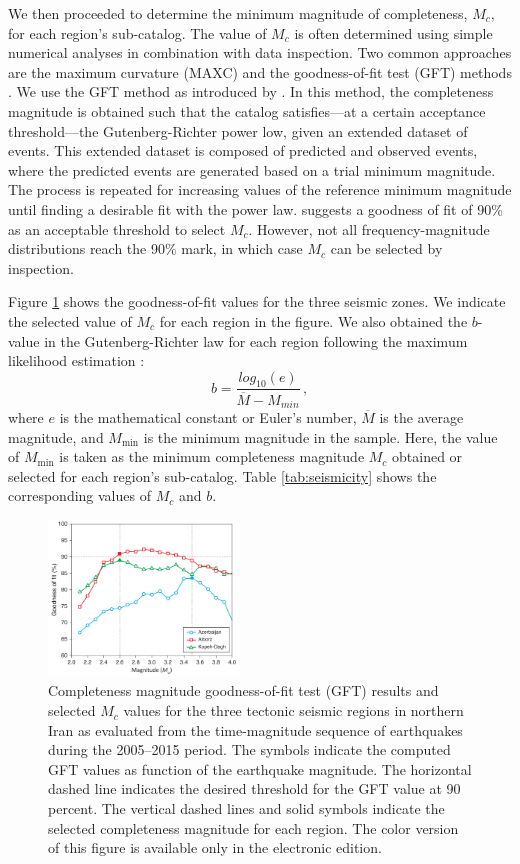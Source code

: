 We then proceeded to determine the minimum magnitude of completeness, $M_c$, for each region's sub-catalog. The value of $M_c$ is often determined using simple numerical analyses in combination with data inspection. Two common approaches are the maximum curvature (MAXC) and the goodness-of-fit test (GFT) methods \citep{Wiemer2001}. We use the GFT method as introduced by \citet{Wiemer2000}. In this method, the completeness magnitude is obtained such that the catalog satisfies---at a certain acceptance threshold---the Gutenberg-Richter power low, given an extended dataset of events. This extended dataset is composed of predicted and observed events, where the predicted events are generated based on a trial minimum magnitude. The process is repeated for increasing values of the reference minimum magnitude until finding a desirable fit with the power law. \citet{Wiemer2000} suggests a goodness of fit of 90\% as an acceptable threshold to select $M_c$. However, not all frequency-magnitude distributions reach the 90\% mark, in which case $M_c$ can be selected by inspection. 

Figure \ref{fig:completeness} shows the goodness-of-fit values for the three seismic zones. We indicate the selected value of $M_c$ for each region in the figure. We also obtained the $b$-value in the Gutenberg-Richter law for each region following the maximum likelihood estimation \citep{Aki1965}:
% 
\begin{equation}
	b = \frac{log_{10}(e)}{\overline{M} - M_{min}} \, ,
\end{equation}
% 
where $e$ is the mathematical constant or Euler's number, $\overline{M}$ is the average magnitude, and $M_{\min}$ is the minimum magnitude in the sample. Here, the value of $M_{\min}$ is taken as the minimum completeness magnitude $M_c$ obtained or selected for each region's sub-catalog. Table \ref{tab:seismicity} shows the corresponding values of $M_c$ and $b$.

\begin{figure}%
	\centering
	\includegraphics[width=0.45\textwidth]{figures/pdf/figure-04} 
	\caption{Completeness magnitude goodness-of-fit test (GFT) results and selected $M_c$ values for the three tectonic seismic regions in northern Iran as evaluated from the time-magnitude sequence of earthquakes during the 2005--2015 period. The symbols indicate the computed GFT values as function of the earthquake magnitude. The horizontal dashed line indicates the desired threshold for the GFT value at 90 percent. The vertical dashed lines and solid symbols indicate the selected completeness magnitude for each region. The color version of this figure is available only in the electronic edition.}
	\label{fig:completeness}
\end{figure} 


